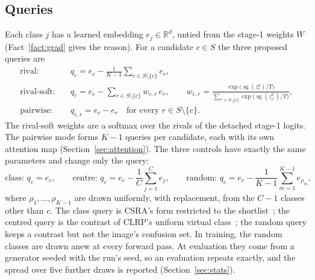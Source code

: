 \documentclass[11pt,a4paper]{article}
\theoremstyle{plain}
\newcommand{\R}{\mathbb{R}}
\newcommand{\sg}{\operatorname{sg}}
\begin{document}
\subsection{Queries}\label{sec:queries}
Each class $j$ has a learned embedding $e_j\in\R^d$, untied from the stage-1 weights $W$ (Fact~\ref{fact:grad} gives
the reason). For a candidate $c\in S$ the three proposed queries are
\begin{align}
\text{rival:}\quad & q_c=e_c-\frac{1}{K-1}\sum_{r\in S\setminus\{c\}}e_r, \label{eq:rival}\\
\text{rival-soft:}\quad & q_c=e_c-\sum_{r\in S\setminus\{c\}}w_{c,r}\,e_r,\qquad
  w_{c,r}=\frac{\exp\bigl(\sg(z^0_r)/T\bigr)}{\sum_{r'\in S\setminus\{c\}}\exp\bigl(\sg(z^0_{r'})/T\bigr)}, \label{eq:rivalsoft}\\
\text{pairwise:}\quad & q_{c,r}=e_c-e_r\quad\text{for every } r\in S\setminus\{c\}. \label{eq:pairwise}
\end{align}
The rival-soft weights are a softmax over the rivals of the detached stage-1 logits. The pairwise mode forms $K-1$
queries per candidate, each with its own attention map (Section~\ref{sec:attention}).
The three controls have exactly the same parameters and change only the query:
\begin{equation}
\text{class: } q_c=e_c,\qquad
\text{centre: } q_c=e_c-\frac{1}{C}\sum_{j=1}^{C}e_j,\qquad
\text{random: } q_c=e_c-\frac{1}{K-1}\sum_{m=1}^{K-1}e_{\rho_m},
\label{eq:controls}
\end{equation}
where $\rho_1,\dots,\rho_{K-1}$ are drawn uniformly, with replacement, from the $C-1$ classes other than $c$. The class
query is CSRA's form restricted to the shortlist~\citep{zhu2021csra}; the centred query is the contrast of CLRP's
uniform virtual class~\citep{gu2018clrp}; the random query keeps a contrast but not the image's confusion set. In
training, the random classes are drawn anew at every forward pass. At evaluation they come from a generator seeded
with the run's seed, so an evaluation repeats exactly, and the spread over five further draws is reported
(Section~\ref{sec:stats}).
\end{document}
